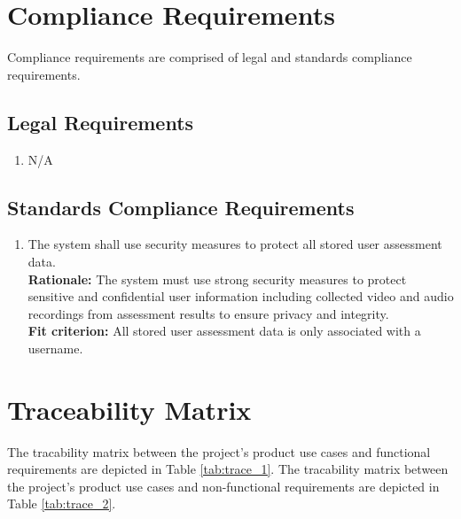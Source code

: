 \documentclass[12pt]{article}
\begin{document}
\newpage

\section{Compliance Requirements}
\hspace{2em}Compliance requirements are comprised of legal and standards compliance requirements.
\subsection{Legal Requirements}
\begin{enumerate}[label={CR-LR}1. ]
  \item N/A
\end{enumerate}
\subsection{Standards Compliance Requirements}
\begin{enumerate}[label={CR-STD}1. ]
  \item The system shall use security measures to protect all stored user assessment data.\\
  \textbf{Rationale: }The system must use strong security measures to protect sensitive and confidential user information including collected video and audio recordings from assessment results to ensure privacy and integrity.\\
  \textbf{Fit criterion: }All stored user assessment data is only associated with a username. 

\end{enumerate}

\newpage

\section*{Traceability Matrix}

\hspace{2em} The tracability matrix between the project's product use cases and functional requirements are depicted in Table \ref{tab:trace_1}.
The tracability matrix between the project's product use cases and non-functional requirements are depicted in Table \ref{tab:trace_2}.
\end{document}
